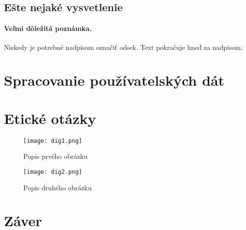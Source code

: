 \documentclass[10pt,twoside,slovak,a4paper]{article}
\begin{document}
\subsection{Ešte nejaké vysvetlenie} \label{ina:este}

\paragraph{Veľmi dôležitá poznámka.}
Niekedy je potrebné nadpisom označiť odsek. Text pokračuje hneď za nadpisom.



\section{Spracovanie používatelských dát} \label{dolezita}




\section{Etické otázky} \label{dolezitejsia}

\begin{figure}[htbp]
  \centering
  \begin{minipage}{0.45\textwidth}
    \centering
    \texttt{[image: dig1.png]}
    \caption{Popis prvého obrázku}
    \label{fig:dig1}
  \end{minipage}\hfill
  \begin{minipage}{0.45\textwidth}
    \centering
    \texttt{[image: dig2.png]}
    \caption{Popis druhého obrázku}
    \label{fig:dig2}
  \end{minipage}
\end{figure}


\section{Záver} \label{zaver} %






\end{document}
